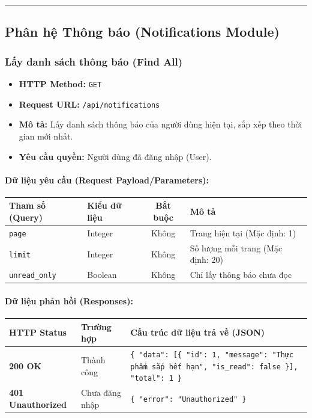 \documentclass[12pt,a4paper]{article}
\begin{document}
\vskip 0.4cm
\noindent\rule{\textwidth}{0.3pt}
\vskip 0.4cm

\subsection{Phân hệ Thông báo (Notifications Module)}

\subsubsection{Lấy danh sách thông báo (Find All)}
\begin{itemize}[leftmargin=*]
    \item \textbf{HTTP Method:} \texttt{GET}
    \item \textbf{Request URL:} \texttt{/api/notifications}
    \item \textbf{Mô tả:} Lấy danh sách thông báo của người dùng hiện tại, sắp xếp theo thời gian mới nhất.
    \item \textbf{Yêu cầu quyền:} Người dùng đã đăng nhập (User).
\end{itemize}

\paragraph{Dữ liệu yêu cầu (Request Payload/Parameters):}
\begin{longtable}{|p{2.8cm}|p{2.2cm}|c|p{7.0cm}|}
\hline
\textbf{Tham số (Query)} & \textbf{Kiểu dữ liệu} & \textbf{Bắt buộc} & \textbf{Mô tả} \\ \hline
\endhead
\texttt{page} & Integer & Không & Trang hiện tại (Mặc định: 1) \\ \hline
\texttt{limit} & Integer & Không & Số lượng mỗi trang (Mặc định: 20) \\ \hline
\texttt{unread\_only} & Boolean & Không & Chỉ lấy thông báo chưa đọc \\ \hline
\end{longtable}

\paragraph{Dữ liệu phản hồi (Responses):}
\begin{longtable}{|p{2.8cm}|p{3.2cm}|p{8.0cm}|}
\hline
\textbf{HTTP Status} & \textbf{Trường hợp} & \textbf{Cấu trúc dữ liệu trả về (JSON)} \\ \hline
\endhead
\textbf{200 OK} & Thành công & \texttt{\{ "data": [\{ "id": 1, "message": "Thực phẩm sắp hết hạn", "is\_read": false \}], "total": 1 \}} \\ \hline
\textbf{401 Unauthorized} & Chưa đăng nhập & \texttt{\{ "error": "Unauthorized" \}} \\ \hline
\end{longtable}
\end{document}
